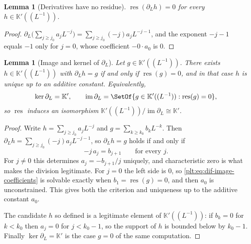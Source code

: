 \documentclass[11pt,oneside]{article}
\theoremstyle{plain}
\newtheorem{lemma}[theorem]{Lemma}
\theoremstyle{definition}
\theoremstyle{remark}
\newcommand{\K}{\mathbb{K}}
\begin{document}
\begin{lemma}[Derivatives have no residue]\label{plt:lem:dif-res-derivative}
\(\operatorname{res}(\partial_{L}h)=0\) for every \(h\in\K'((L^{-1}))\).
\end{lemma}

\begin{proof}
\(\partial_{L}\bigl(\sum_{j\ge j_{0}}a_{j}L^{-j}\bigr)
=\sum_{j\ge j_{0}}(-j)a_{j}L^{-j-1}\), and the exponent \(-j-1\) equals
\(-1\) only for \(j=0\), whose coefficient \(-0\cdot a_{0}\) is \(0\).
\end{proof}

\begin{lemma}[Image and kernel of \(\partial_{L}\)]
\label{plt:lem:dif-image-laurent}
Let \(g\in\K'((L^{-1}))\).  There exists \(h\in\K'((L^{-1}))\) with
\(\partial_{L}h=g\) if and only if \(\operatorname{res}(g)=0\), and in that
case \(h\) is unique up to an additive constant.  Equivalently,
\[
  \ker\partial_{L}=\K',
  \qquad
  \operatorname{im}\partial_{L}
  =\SetOf{g\in\K'((L^{-1})):\operatorname{res}(g)=0},
\]
so \(\operatorname{res}\) induces an isomorphism
\(\K'((L^{-1}))/\operatorname{im}\partial_{L}\cong\K'\).
\end{lemma}

\begin{proof}
Write \(h=\sum_{j\ge j_{0}}a_{j}L^{-j}\) and
\(g=\sum_{k\ge k_{0}}b_{k}L^{-k}\).  Then
\(\partial_{L}h=\sum_{j\ge j_{0}}(-j)a_{j}L^{-j-1}\), so
\(\partial_{L}h=g\) holds if and only if
\begin{equation}\label{plt:eq:dif-image-coefficients}
  -j\,a_{j}=b_{j+1}
  \qquad\text{for every }j .
\end{equation}
For \(j\ne0\) this determines \(a_{j}=-b_{j+1}/j\) uniquely, and characteristic
zero is what makes the division legitimate.  For \(j=0\) the left side is
\(0\), so \eqref{plt:eq:dif-image-coefficients} is solvable exactly when
\(b_{1}=\operatorname{res}(g)=0\), and then \(a_{0}\) is unconstrained.  This
gives both the criterion and uniqueness up to the additive constant \(a_{0}\).

The candidate \(h\) so defined is a legitimate element of \(\K'((L^{-1}))\):
if \(b_{k}=0\) for \(k<k_{0}\) then \(a_{j}=0\) for \(j<k_{0}-1\), so the
support of \(h\) is bounded below by \(k_{0}-1\).  Finally
\(\ker\partial_{L}=\K'\) is the case \(g=0\) of the same computation.
\end{proof}
\end{document}
